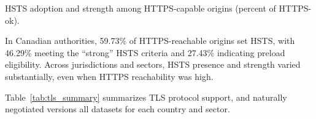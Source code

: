 \documentclass[conference]{IEEEtran}
\begin{document}
\begin{table}[t]
  \caption{HSTS adoption and strength among HTTPS-capable origins (percent of HTTPS-ok).}
  \label{tab:https_hsts_quality}
  \centering
  \scriptsize
  \setlength{\tabcolsep}{3.5pt}
  \renewcommand{\arraystretch}{1.15}

  \begin{adjustbox}{max width=\columnwidth}
  \end{adjustbox}
\end{table}

In Canadian authorities, 59.73\% of HTTPS-reachable origins set HSTS, with 46.29\% meeting the ``strong'' HSTS criteria and 27.43\% indicating preload eligibility.
Across jurisdictions and sectors, HSTS presence and strength varied substantially, even when HTTPS reachability was high.

Table~\ref{tab:tls_summary} summarizes TLS protocol support, and naturally negotiated versions all datasets for each country and sector. 
 

  
\end{document}
